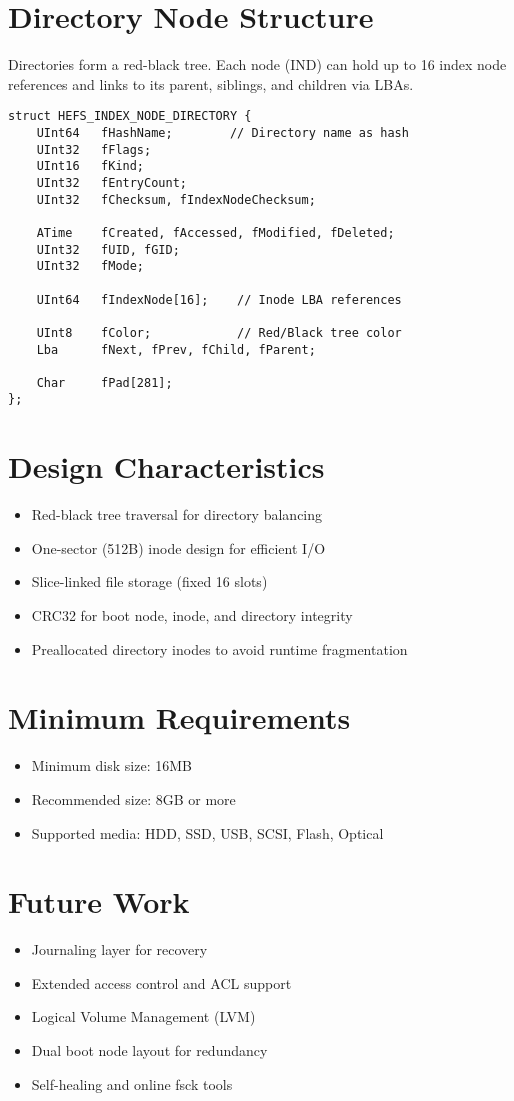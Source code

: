 \documentclass{article}
\begin{document}
\section{Directory Node Structure}
Directories form a red-black tree. Each node (IND) can hold up to 16 index node references and links to its parent, siblings, and children via LBAs.

\begin{lstlisting}[style=cstyle, caption={HEFS\_INDEX\_NODE\_DIRECTORY}]
struct HEFS_INDEX_NODE_DIRECTORY {
    UInt64   fHashName;        // Directory name as hash
    UInt32   fFlags;
    UInt16   fKind;
    UInt32   fEntryCount;
    UInt32   fChecksum, fIndexNodeChecksum;

    ATime    fCreated, fAccessed, fModified, fDeleted;
    UInt32   fUID, fGID;
    UInt32   fMode;

    UInt64   fIndexNode[16];    // Inode LBA references

    UInt8    fColor;            // Red/Black tree color
    Lba      fNext, fPrev, fChild, fParent;

    Char     fPad[281];
};
\end{lstlisting}

\section{Design Characteristics}

\begin{itemize}
    \item Red-black tree traversal for directory balancing
    \item One-sector (512B) inode design for efficient I/O
    \item Slice-linked file storage (fixed 16 slots)
    \item CRC32 for boot node, inode, and directory integrity
    \item Preallocated directory inodes to avoid runtime fragmentation
\end{itemize}

\section{Minimum Requirements}

\begin{itemize}
    \item Minimum disk size: 16MB
    \item Recommended size: 8GB or more
    \item Supported media: HDD, SSD, USB, SCSI, Flash, Optical
\end{itemize}

\section{Future Work}
\begin{itemize}
    \item Journaling layer for recovery
    \item Extended access control and ACL support
    \item Logical Volume Management (LVM)
    \item Dual boot node layout for redundancy
    \item Self-healing and online fsck tools
\end{itemize}
\end{document}
